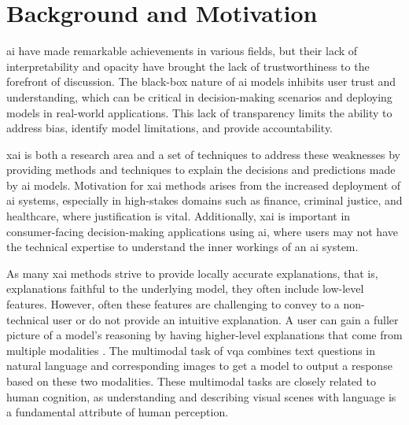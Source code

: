 \label{sec:1_1_background_and_motivation}

\begin{comment}
In about a page, summarize the most important background information. The text usually leads to YOUR PROBLEM STATEMENT (in the next section) and gives arguments about why this is a challenge today.
\end{comment}

\section{Background and Motivation}


    \gls{ai} have made remarkable achievements in various fields, but their lack of interpretability and opacity have brought the lack of trustworthiness to the forefront of discussion. 
    The black-box nature of \gls{ai} models inhibits user trust and understanding, which can be critical in decision-making scenarios and deploying models in real-world applications. This lack of transparency limits the ability to address bias, identify model limitations, and provide accountability. 



    \gls{xai} is both a research area and a set of techniques to address these weaknesses by providing methods and techniques to explain the decisions and predictions made by \gls{ai} models.     
    Motivation for \gls{xai} methods arises from the increased deployment of \gls{ai} systems, especially in high-stakes domains such as finance, criminal justice, and healthcare, where justification is vital.
    Additionally, \gls{xai} is important in consumer-facing decision-making applications using \gls{ai}, where users may not have the technical expertise to understand the inner workings of an \gls{ai} system. 
   


    As many \gls{xai} methods strive to provide locally accurate explanations, that is, explanations faithful to the underlying model, they often include low-level features. However, often these features are challenging to convey to a non-technical user or do not provide an intuitive explanation. 
    A user can gain a fuller picture of a model's reasoning by having higher-level explanations that come from multiple modalities \cite{alipourStudyMultimodalInteractive2020}.
    The multimodal task of \gls{vqa} combines text questions in natural language and corresponding images to get a model to output a response based on these two modalities. These multimodal tasks are closely related to human cognition, as understanding and describing visual scenes with language is a fundamental attribute of human perception. 
    

